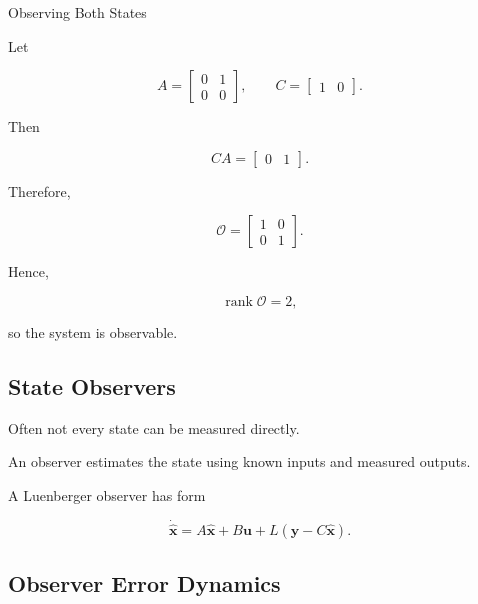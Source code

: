 \begin{workedexamplebox}{Observing Both States}

Let

\[
A
=
\begin{bmatrix}
0 & 1\\
0 & 0
\end{bmatrix},
\qquad
C
=
\begin{bmatrix}
1 & 0
\end{bmatrix}.
\]

Then

\[
CA
=
\begin{bmatrix}
0 & 1
\end{bmatrix}.
\]

Therefore,

\[
\mathcal{O}
=
\begin{bmatrix}
1 & 0\\
0 & 1
\end{bmatrix}.
\]

Hence,

\begin{answerbox}
\[
\boxed{
\operatorname{rank}\mathcal{O}=2,
}
\]

so the system is observable.
\end{answerbox}

\end{workedexamplebox}

\subsection{State Observers}
\label{subsec:state-observers}

Often not every state can be measured directly.

An observer estimates the state using known inputs and measured outputs.

A Luenberger observer has form

\[
\boxed{
\dot{\hat{\mathbf{x}}}
=
A\hat{\mathbf{x}}
+
B\mathbf{u}
+
L
\left(
\mathbf{y}
-
C\hat{\mathbf{x}}
\right).
}
\]

\subsection{Observer Error Dynamics}
\label{subsec:observer-error-dynamics}

